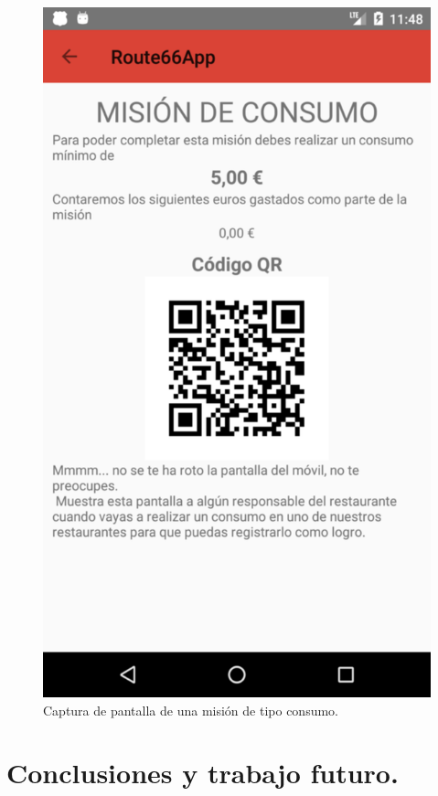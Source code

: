 \documentclass[twoside]{report}
\begin{document}
\begin{figure}[H]
\begin{center}
\includegraphics[scale=0.2]{images/userguide/31.png}
\caption{Captura de pantalla de una misión de tipo consumo.}
\end{center}
\end{figure}



\chapter{Conclusiones y trabajo futuro.}
\end{document}
